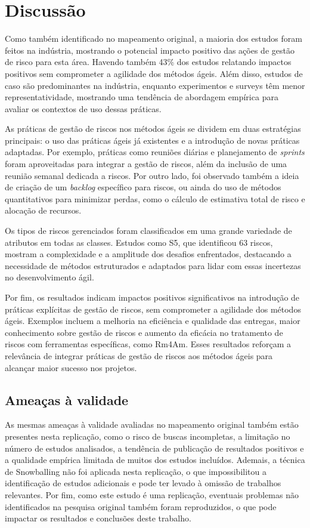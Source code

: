 \documentclass[
	12pt,
	openright,
	twoside,
	a4paper,
	english,
	brazil
	]{abntex2}
\begin{document}
\section{Discussão}

Como também identificado no mapeamento original, a maioria dos estudos foram feitos na indústria, mostrando o potencial impacto positivo das ações de gestão de risco para esta área. Havendo também 43\% dos estudos relatando impactos positivos sem comprometer a agilidade dos métodos ágeis. Além disso, estudos de caso são predominantes na indústria, enquanto experimentos e surveys têm menor representatividade, mostrando uma tendência de abordagem empírica para avaliar os contextos de uso dessas práticas.

As práticas de gestão de riscos nos métodos ágeis se dividem em duas estratégias principais: o uso das práticas ágeis já existentes e a introdução de novas práticas adaptadas. Por exemplo, práticas como reuniões diárias e planejamento de \textit{sprints} foram aproveitadas para integrar a gestão de riscos, além da inclusão de uma reunião semanal dedicada a riscos. Por outro lado, foi observado também a ideia de criação de um \textit{backlog} específico para riscos, ou ainda do uso de métodos quantitativos para minimizar perdas, como o cálculo de estimativa total de risco e alocação de recursos.

Os tipos de riscos gerenciados foram classificados em uma grande variedade de atributos em todas as classes. Estudos como S5, que identificou 63 riscos, mostram a complexidade e a amplitude dos desafios enfrentados, destacando a necessidade de métodos estruturados e adaptados para lidar com essas incertezas no desenvolvimento ágil.

Por fim, os resultados indicam impactos positivos significativos na introdução de práticas explícitas de gestão de riscos, sem comprometer a agilidade dos métodos ágeis. Exemplos incluem a melhoria na eficiência e qualidade das entregas, maior conhecimento sobre gestão de riscos e aumento da eficácia no tratamento de riscos com ferramentas específicas, como Rm4Am. Esses resultados reforçam a relevância de integrar práticas de gestão de riscos aos métodos ágeis para alcançar maior sucesso nos projetos.


\subsection{Ameaças à validade}

As mesmas ameaças à validade avaliadas no mapeamento original também estão presentes nesta replicação, como o risco de buscas incompletas, a limitação no número de estudos analisados, a tendência de publicação de resultados positivos e a qualidade empírica limitada de muitos dos estudos incluídos. Ademais, a técnica de Snowballing não foi aplicada nesta replicação, o que impossibilitou a identificação de estudos adicionais e pode ter levado à omissão de trabalhos relevantes. Por fim, como este estudo é uma replicação, eventuais problemas não identificados na pesquisa original também foram reproduzidos, o que pode impactar os resultados e conclusões deste trabalho.
\end{document}
